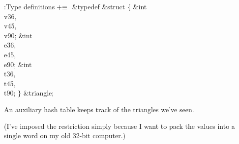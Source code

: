 \Y\B\4:Type definitions\X${}\mathrel+\equiv{}$\6
\&{typedef} \&{struct} ${}\{{}$\1\6
\&{int} \\{v36}${},{}$ \\{v45}${},{}$ \\{v90};\6
\&{int} \\{e36}${},{}$ \\{e45}${},{}$ \\{e90};\6
\&{int} \\{t36}${},{}$ \\{t45}${},{}$ \\{t90};\2\6
${}\}{}$ \&{triangle};\par
\fi

An auxiliary hash table keeps track of the triangles we've seen.

(I've imposed the restriction  simply because I
want to
pack the values  into a single word on my
old 32-bit computer.)

